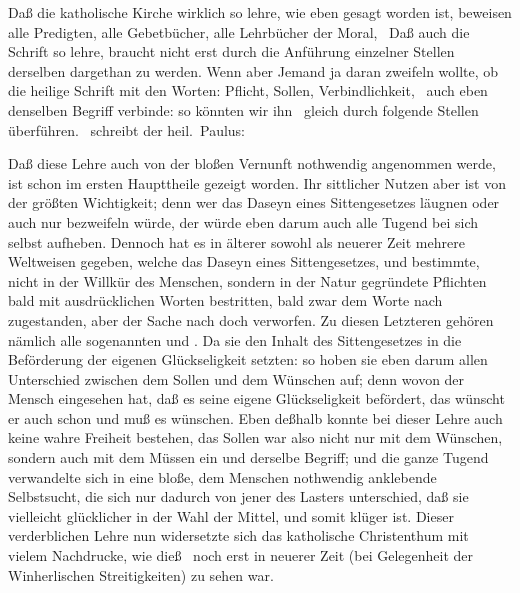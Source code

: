 Daß die katholische Kirche wirklich so lehre, wie eben gesagt worden ist, beweisen alle Predigten, alle Gebetbücher, alle Lehrbücher der Moral, \usw\ Daß auch die Schrift so lehre, braucht nicht erst durch die Anführung einzelner Stellen derselben dargethan zu werden. Wenn aber Jemand ja daran zweifeln wollte, ob die heilige Schrift mit den Worten: Pflicht, Sollen, Verbindlichkeit, \udgl\  auch eben denselben Begriff verbinde: so könnten wir ihn \zB\  gleich durch folgende Stellen überführen. \ schreibt der heil.\ Paulus:  \usw~

Daß diese Lehre auch von der bloßen Vernunft nothwendig angenommen werde, ist schon im ersten Haupttheile gezeigt worden. Ihr sittlicher Nutzen aber ist von der größten Wichtigkeit; denn wer das Daseyn eines Sittengesetzes läugnen oder auch nur bezweifeln würde, der würde eben darum auch alle Tugend bei sich selbst aufheben. Dennoch hat es in älterer sowohl als neuerer Zeit mehrere Weltweisen gegeben, welche das Daseyn eines Sittengesetzes, und bestimmte, nicht in der Willkür des Menschen, sondern in der Natur gegründete Pflichten bald mit ausdrücklichen Worten bestritten, bald zwar dem Worte nach zugestanden, aber der Sache nach doch verworfen. Zu diesen Letzteren gehören nämlich alle sogenannten  und . Da sie den Inhalt des Sittengesetzes in die Beförderung der eigenen Glückseligkeit setzten: so hoben sie eben darum allen Unterschied zwischen dem Sollen und dem Wünschen auf; denn wovon der Mensch eingesehen hat, daß es seine eigene Glückseligkeit befördert, das wünscht er auch schon und muß es wünschen. Eben deßhalb konnte bei dieser Lehre auch keine wahre Freiheit bestehen, das Sollen war also nicht nur mit dem Wünschen, sondern auch mit dem Müssen ein und derselbe Begriff; und die ganze Tugend verwandelte sich in eine bloße, dem Menschen nothwendig anklebende Selbstsucht, die sich nur dadurch von jener des Lasters unterschied, daß sie vielleicht glücklicher in der Wahl der Mittel, und somit klüger ist. Dieser verderblichen Lehre nun widersetzte sich das katholische Christenthum mit vielem Nachdrucke, wie dieß \zB\  noch erst in neuerer Zeit (bei Gelegenheit der Winherlischen Streitigkeiten) zu sehen war.

